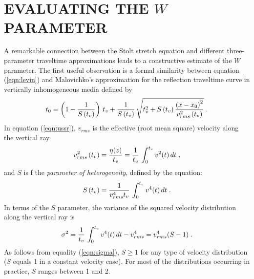\section{EVALUATING THE $W$ PARAMETER}

A remarkable connection between the Stolt stretch equation and
different three-parameter traveltime approximations leads to a
constructive estimate of the $W$ parameter.  The first useful
observation is a formal similarity between equation (\ref{eqn:levin})
and Malovichko's approximation for the reflection traveltime curve in
vertically inhomogeneous media \cite{ussr,Sword.sep.51.313,castle,nmo}
defined by
\begin{equation}
t_0=
\left(1-{1\over {S\left(t_v\right)}}\right) \,t_v+
{1\over {S\left(t_v\right)}}\,
\sqrt{t_v^2 + {{S\left(t_v\right)}\,
 {{\left(x-x_0\right)^2} \over {v_{rms}^2\left(t_v\right)}}}}\;.
\label{eqn:ussr} 
\end{equation}
In equation (\ref{eqn:ussr}), $v_{rms}$ is the effective (root
mean square) velocity along the vertical ray
\begin{equation}
v_{rms}^2\left(t_v\right)={\eta(z)\over t_v}=
{1 \over t_v}\,\int_{0}^{t_v} v^2(t) \,dt\;,
\label{eqn:vrms} 
\end{equation}
and $S$ is f the {\em parameter of heterogeneity}, defined by the equation:
\begin{equation}
S\left(t_v\right)={1 \over{v_{rms}^4 t_v}}\,\int_{0}^{t_v} v^4(t) \,dt\;.
\label{eqn:heter} 
\end{equation}
In terms of the $S$ parameter, the variance of the squared velocity
distribution along the vertical ray is
\begin{equation}
\sigma^2={1 \over t_v}\,\int_{0}^{t_v} v^4(t) \,dt - v_{rms}^4=v_{rms}^4 (S-1)\;.
\label{eqn:sigma} 
\end{equation}
As follows from equality (\ref{eqn:sigma}), $S\geq 1$ for any type of
velocity distribution ($S$ equals 1 in a constant velocity case). For
most of the distributions occurring in practice, $S$ ranges between 1
and 2.

